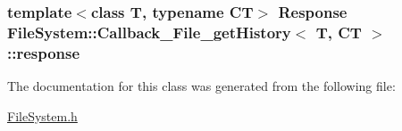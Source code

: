 \subsubsection[{response}]{\setlength{\rightskip}{0pt plus 5cm}template$<$class T, typename C\+T$>$ {\bf Response} {\bf File\+System\+::\+Callback\+\_\+\+File\+\_\+get\+History}$<$ T, C\+T $>$\+::response}\label{class_file_system_1_1_callback___file__get_history_a16ca6a7305fd1d83892582b167801c6e}


The documentation for this class was generated from the following file\+:\begin{DoxyCompactItemize}
\item 
\hyperlink{_file_system_8h}{File\+System.\+h}\end{DoxyCompactItemize}
